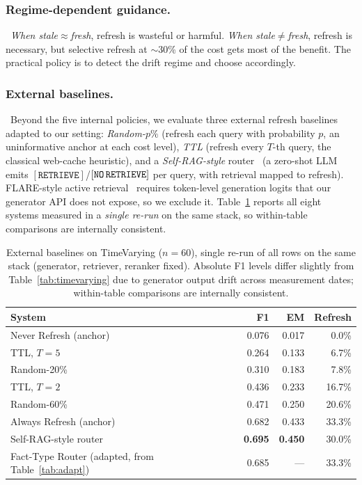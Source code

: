 \documentclass[pdflatex,sn-basic]{sn-jnl}
\begin{document}
\subsubsection*{Regime-dependent guidance.}~\emph{When stale$\approx$fresh}, refresh is wasteful or harmful. \emph{When stale$\neq$fresh}, refresh is necessary, but selective refresh at $\sim$30\% of the cost gets most of the benefit. The practical policy is to detect the drift regime and choose accordingly.

\subsubsection*{External baselines.}~Beyond the five internal policies, we evaluate three external refresh baselines adapted to our setting: \emph{Random-$p\%$} (refresh each query with probability $p$, an uninformative anchor at each cost level), \emph{TTL} (refresh every $T$-th query, the classical web-cache heuristic), and a \emph{Self-RAG-style} router~\cite{asai2023selfrag} (a zero-shot LLM emits $[\texttt{RETRIEVE}]$/$[\texttt{NO\,RETRIEVE}]$ per query, with retrieval mapped to refresh). FLARE-style active retrieval~\cite{jiang2023flare} requires token-level generation logits that our generator API does not expose, so we exclude it. Table~\ref{tab:external} reports all eight systems measured in a \emph{single re-run} on the same stack, so within-table comparisons are internally consistent.

\begin{table}[htbp]
\caption{External baselines on TimeVarying ($n{=}60$), single re-run of all rows on the same stack (generator, retriever, reranker fixed). Absolute F1 levels differ slightly from Table~\ref{tab:timevarying} due to generator output drift across measurement dates; within-table comparisons are internally consistent.}
\label{tab:external}
\centering
\small
\begin{tabular}{lrrr}
\toprule
System & F1 & EM & Refresh \\
\midrule
Never Refresh (anchor) & 0.076 & 0.017 & 0.0\% \\
TTL, $T{=}5$ & 0.264 & 0.133 & 6.7\% \\
Random-20\% & 0.310 & 0.183 & 7.8\% \\
TTL, $T{=}2$ & 0.436 & 0.233 & 16.7\% \\
Random-60\% & 0.471 & 0.250 & 20.6\% \\
Always Refresh (anchor) & 0.682 & 0.433 & 33.3\% \\
Self-RAG-style router & \textbf{0.695} & \textbf{0.450} & 30.0\% \\
\midrule
Fact-Type Router (adapted, from Table~\ref{tab:adapt}) & 0.685 & --- & 33.3\% \\
\bottomrule
\end{tabular}
\end{table}
\end{document}
